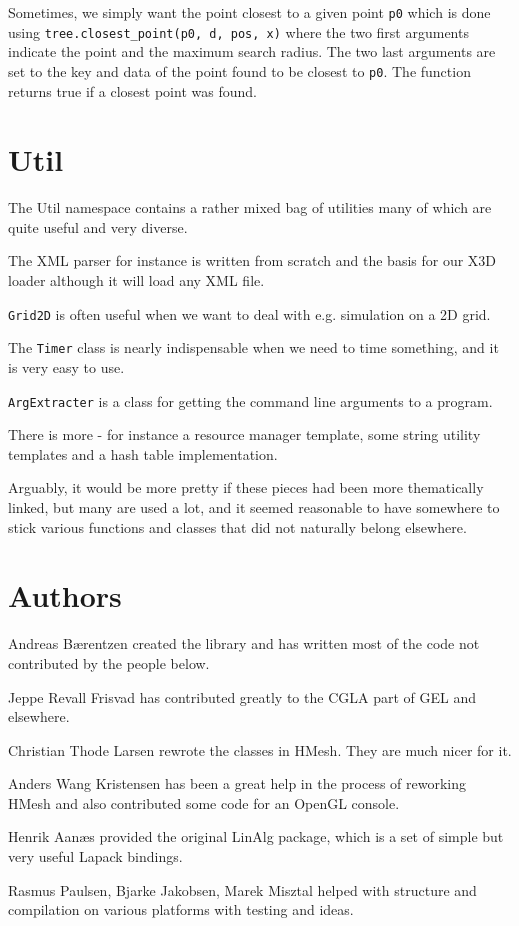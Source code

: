 \documentclass[a4paper]{article}
\begin{document}
Sometimes, we simply want the point closest to a given point \texttt{p0} which is done using \texttt{tree.closest\_point(p0, d, pos, x)} where the two first arguments indicate the point and the maximum search radius. The two last arguments are set to the key and data of the point found to be closest to \texttt{p0}. The function returns true if a closest point was found.




\section{Util}
The Util namespace contains a rather mixed bag of utilities many of which are quite useful and very diverse. 
\begin{trivlist}
\item The XML parser for instance is written from scratch and the basis for our X3D loader although it will load any XML file. 
\item \texttt{Grid2D} is often useful when we want to deal with e.g. simulation on a 2D grid. 
\item The \texttt{Timer} class is nearly indispensable when we need to time something, and it is very easy to use. 
\item \texttt{ArgExtracter} is a class for getting the command line arguments to a program. 
\item There is more - for instance a resource manager template, some string utility templates and a hash table implementation.
\end{trivlist}
Arguably, it would be more pretty if these pieces had been more thematically linked, but many are used a lot, and it seemed reasonable to have somewhere to stick various functions and classes that did not naturally belong elsewhere.


\section{Authors}  
\begin{trivlist}
\item Andreas B{\ae}rentzen created the library and has written most of the code not contributed by the people below.
\item Jeppe Revall Frisvad has contributed greatly to the CGLA part of GEL and elsewhere.
\item Christian Thode Larsen rewrote the classes in HMesh. They are much nicer for it.
\item Anders Wang Kristensen has been a great help in the process of reworking HMesh and also contributed some code for an OpenGL console.
\item Henrik Aan{\ae}s provided the original LinAlg package, which is a set of simple but very useful Lapack bindings.
\item Rasmus Paulsen, Bjarke Jakobsen, Marek Misztal helped with structure and compilation on various platforms with testing and ideas.
\end{trivlist}
\end{document}
